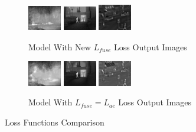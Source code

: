 \begin{figure}[htbp]
    \begin{subfigure}[b]{\textwidth}
        \includegraphics[width=0.16\textwidth, height=0.1\textheight]{imgs/ch5/ours/20.jpg}
        \includegraphics[width=0.16\textwidth, height=0.1\textheight]{imgs/ch5/ours/12.jpg}
        \includegraphics[width=0.16\textwidth, height=0.1\textheight]{imgs/ch5/ours/02.jpg}
        \captionsetup{justification=raggedright,singlelinecheck=false}
        \caption{Model With New $L_{fuse}$ Loss Output Images}
        \label{fig:ch5:met2:ours}
    \end{subfigure}
    \vspace{0.01cm}
    \begin{subfigure}[b]{\textwidth}
        \includegraphics[width=0.16\textwidth, height=0.1\textheight]{imgs/ch5/sameLoss/20.png}
        \includegraphics[width=0.16\textwidth, height=0.1\textheight]{imgs/ch5/sameLoss/12.png}
        \includegraphics[width=0.16\textwidth, height=0.1\textheight]{imgs/ch5/sameLoss/02.png}
        \captionsetup{justification=raggedright,singlelinecheck=false}
        \caption{Model With $ L_{fuse} = L_{ae}$ Loss Output Images}
        \label{fig:ch5:met2:sameLoss}
    \end{subfigure}
    \captionsetup{justification=raggedright,singlelinecheck=false}
        \caption{Loss Functions Comparison}
    \label{fig:ch5:met2}
\end{figure}

